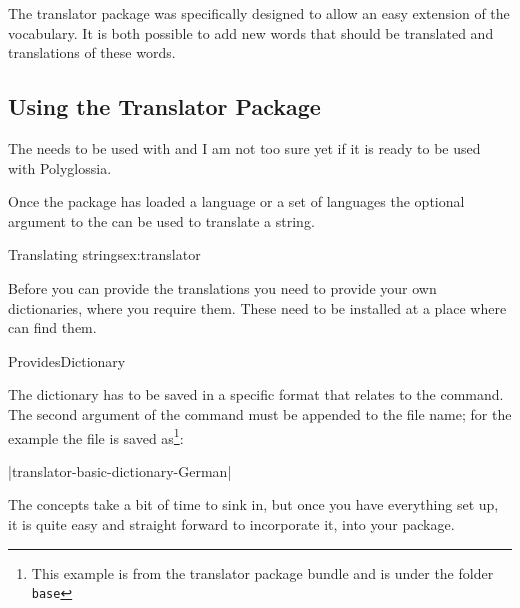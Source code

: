 The translator package was specifically designed to allow an easy
extension of the vocabulary. It is both possible to add new words that
should be translated and translations of these words.

\subsection{Using the Translator Package}

  The  needs to be used with  and I am not too sure yet 
  if it is ready  to be used with Polyglossia.

Once the package has loaded a language or a set of languages the optional argument to the
\cmd{\translate} can be used to translate a string. 

\begin{texexample}{Translating strings}{ex:translator}
\end{texexample}

Before you can provide the translations you need to provide your own dictionaries, where you require them. These need to be installed at a place where \tex can find them.

\begin{docCmd} {ProvidesDictionary} {   }
\end{docCmd}

The dictionary has to be saved in a specific format that relates to the  command. The second argument of the command must be appended to the file name; for the example the file is saved as\footnote{This  example is from the translator package bundle and is under the folder \texttt{base}}:

|translator-basic-dictionary-German|

The concepts take a bit of time to sink in, but once you have everything set up, it is quite easy and straight forward to incorporate it, into your package. 

\begin{teXXX}

\end{teXXX} 

